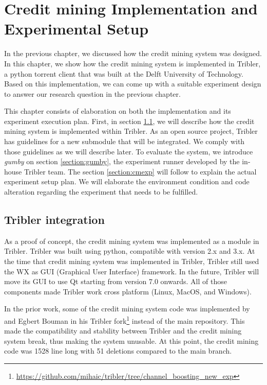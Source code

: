 \chapter{Credit mining Implementation and Experimental Setup}
\label{chp:implexperiment}
In the previous chapter, we discussed how the credit mining system was designed. In this chapter, we show how the credit mining system is implemented in Tribler, a python torrent client that was built at the Delft University of Technology. Based on this implementation, we can come up with a suitable experiment design to answer our research question in the previous chapter. 

This chapter consists of elaboration on both the implementation and its experiment execution plan. First, in section \ref{section:triblerintregration}, we will describe how the credit mining system is implemented within Tribler. As an open source project, Tribler has guidelines for a new submodule that will be integrated. We comply with those guidelines as we will describe later. To evaluate the system, we introduce \textit{gumby} on section \ref{section:gumby}, the experiment runner developed by the in-house Tribler team. The section \ref{section:cmexp} will follow to explain the actual experiment setup plan. We will elaborate the environment condition and code alteration regarding the experiment that needs to be fulfilled.

\section{Tribler integration}
\label{section:triblerintregration}
As a proof of concept, the credit mining system was implemented as a module in Tribler. Tribler was built using python, compatible with version 2.x and 3.x. At the time that credit mining system was implemented in Tribler, Tribler still used the WX as GUI (Graphical User Interface) framework. In the future, Tribler will move its GUI to use Qt starting from version 7.0 onwards. All of those components made Tribler work cross platform (Linux, MacOS, and Windows).

In the prior work, some of the credit mining system code was implemented by \citeauthor{2015:creditmining:capota} and Egbert Bouman in his Tribler fork\footnote{\url{https://github.com/mihaic/tribler/tree/channel_boosting_new_exp}} instead of the main repository. This made the compatibility and stability between Tribler and the credit mining system break, thus making the system unusable. At this point, the credit mining code was 1528 line long with 51 deletions compared to the main branch.


